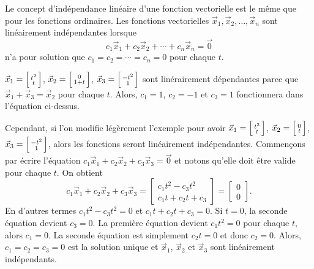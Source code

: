 Le concept d’indépendance linéaire d’une fonction vectorielle est le même que pour les fonctions ordinaires. Les fonctions vectorielles
$\vec{x}_1,\vec{x}_2,\ldots,\vec{x}_n$ sont linéairement indépendantes
lorsque
\begin{equation*}
c_1 \vec{x}_1 + c_2 \vec{x}_2 + \cdots + c_n \vec{x}_n  = \vec{0}
\end{equation*}
n’a pour solution que $c_1 = c_2 = \cdots = c_n = 0$ pour chaque $t$.

\begin{example}
$\vec{x}_1 = \Bigl[ \begin{smallmatrix} t^2 \\ t \end{smallmatrix} \Bigr]$,
$\vec{x}_2 = \Bigl[ \begin{smallmatrix} 0 \\ 1+t \end{smallmatrix} \Bigr]$,
$\vec{x}_3 = \Bigl[ \begin{smallmatrix} -t^2 \\ 1 \end{smallmatrix} \Bigr]$
sont linérairement dépendantes parce que
$\vec{x}_1 + \vec{x}_3 = \vec{x}_2$ pour chaque $t$. Alors, $c_1 =
1$, $c_2 = -1$ et $c_3 = 1$ fonctionnera dans l’équation ci-dessus.

Cependant, si l'on modifie légèrement l’exemple pour avoir
$\vec{x}_1 = \Bigl[ \begin{smallmatrix} t^2 \\ t \end{smallmatrix} \Bigr]$,
$\vec{x}_2 = \Bigl[ \begin{smallmatrix} 0 \\ t \end{smallmatrix} \Bigr]$,
$\vec{x}_3 = \Bigl[ \begin{smallmatrix} -t^2 \\ 1 \end{smallmatrix}
\Bigr]$,
alors les fonctions seront linéairement indépendantes. Commençons par écrire l'équation
$c_1 \vec{x}_1 + c_2 \vec{x}_2 + c_3 \vec{x}_3  = \vec{0}$ et notons qu’elle doit être valide pour chaque $t$. On obtient
\begin{equation*}
c_1 \vec{x}_1 + c_2 \vec{x}_2 + c_3 \vec{x}_3
=
\begin{bmatrix}
c_1 t^2 - c_3 t^2
\\
c_1 t + c_2 t + c_3 
\end{bmatrix}
=
\begin{bmatrix}
0
\\
0
\end{bmatrix} .
\end{equation*}
En d’autres termes
$c_1 t^2 - c_3 t^2 = 0$ et
$c_1 t + c_2 t + c_3 = 0$.
Si $t = 0$, la seconde équation devient $c_3 = 0$. La première équation devient
$c_1 t^2 = 0$ pour chaque $t$, alors $c_1 = 0$.  La seconde équation est simplement $c_2 t = 0$ et donc $c_2 = 0$.  Alors, $c_1 = c_2 = c_3 = 0$
est la solution unique et $\vec{x}_1$,
$\vec{x}_2$ et $\vec{x}_3$ sont linéairement indépendants.
\end{example}

